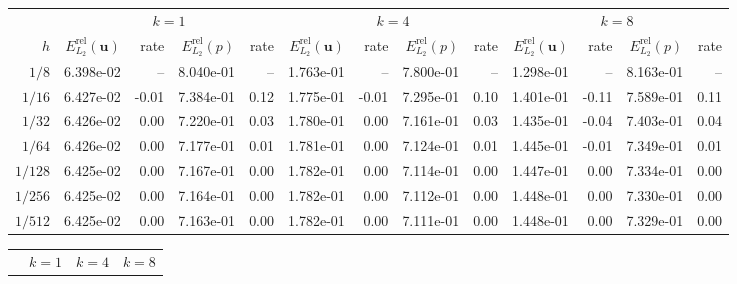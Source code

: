 \par\nolinenumbers
\begin{landscape}
\thispagestyle{empty}
\begin{center}
\centering
{}
\label{tab:annulus_thieulot_v1_p0_disc}
\small
\begin{tabular}{
r rr rr rr rr rr rr
}
\toprule
& \multicolumn{4}{c}{$k=1$} & \multicolumn{4}{c}{$k=4$} & \multicolumn{4}{c}{$k=8$} \\
\cmidrule(lr){2-5}\cmidrule(lr){6-9}\cmidrule(lr){10-13}
$h$ & $E^{\mathrm{rel}}_{L_2}(\mathbf{u})$ & rate & $E^{\mathrm{rel}}_{L_2}(p)$ & rate & $E^{\mathrm{rel}}_{L_2}(\mathbf{u})$ & rate & $E^{\mathrm{rel}}_{L_2}(p)$ & rate & $E^{\mathrm{rel}}_{L_2}(\mathbf{u})$ & rate & $E^{\mathrm{rel}}_{L_2}(p)$ & rate \\
\midrule
$1/8$ & 6.398e-02 & -- & 8.040e-01 & -- & 1.763e-01 & -- & 7.800e-01 & -- & 1.298e-01 & -- & 8.163e-01 & -- \\
$1/16$ & 6.427e-02 & -0.01 & 7.384e-01 & 0.12 & 1.775e-01 & -0.01 & 7.295e-01 & 0.10 & 1.401e-01 & -0.11 & 7.589e-01 & 0.11 \\
$1/32$ & 6.426e-02 & 0.00 & 7.220e-01 & 0.03 & 1.780e-01 & 0.00 & 7.161e-01 & 0.03 & 1.435e-01 & -0.04 & 7.403e-01 & 0.04 \\
$1/64$ & 6.426e-02 & 0.00 & 7.177e-01 & 0.01 & 1.781e-01 & 0.00 & 7.124e-01 & 0.01 & 1.445e-01 & -0.01 & 7.349e-01 & 0.01 \\
$1/128$ & 6.425e-02 & 0.00 & 7.167e-01 & 0.00 & 1.782e-01 & 0.00 & 7.114e-01 & 0.00 & 1.447e-01 & 0.00 & 7.334e-01 & 0.00 \\
$1/256$ & 6.425e-02 & 0.00 & 7.164e-01 & 0.00 & 1.782e-01 & 0.00 & 7.112e-01 & 0.00 & 1.448e-01 & 0.00 & 7.330e-01 & 0.00 \\
$1/512$ & 6.425e-02 & 0.00 & 7.163e-01 & 0.00 & 1.782e-01 & 0.00 & 7.111e-01 & 0.00 & 1.448e-01 & 0.00 & 7.329e-01 & 0.00 \\
\bottomrule
\end{tabular}
\end{center}
\begin{center}
\centering
{}
\label{tab:annulus_thieulot_v1_p1_cont}
\small
\begin{tabular}{
r rr rr rr rr rr rr
}
\toprule
& \multicolumn{4}{c}{$k=1$} & \multicolumn{4}{c}{$k=4$} & \multicolumn{4}{c}{$k=8$} \\

\end{tabular}
\end{center}
\end{landscape}
